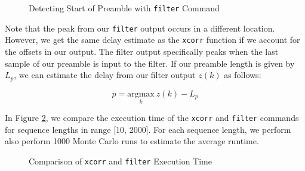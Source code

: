 \documentclass{article}
\begin{document}
\begin{figure}[H]
	\centerline{}
	\caption{Detecting Start of Preamble with \texttt{filter} Command}
	\label{fig::filter_preamble_detect}
\end{figure}

\noindent Note that the peak from our \texttt{filter} output occurs in a different location. However, we get the same delay estimate as the \texttt{xcorr} function if we account for the offsets in our output. The filter output specifically peaks when the last sample of our preamble is input to the filter. If our preamble length is given by $L_p$, we can estimate the delay from our filter output $z(k)$ as follows:

\begin{equation}
	\hat{p} = \underset{k}{\text{argmax}}\ z(k) - L_p
\end{equation}

\noindent In Figure \ref{fig::execution_time}, we compare the execution time of the \texttt{xcorr} and \texttt{filter} commands for sequence lengths in range [10, 2000]. For each sequence length, we perform also perform 1000 Monte Carlo runs to estimate the average runtime.
 
\begin{figure}[H]
	\centerline{}
	\caption{Comparison of \texttt{xcorr} and \texttt{filter} Execution Time}
	\label{fig::execution_time}
\end{figure}
\end{document}
